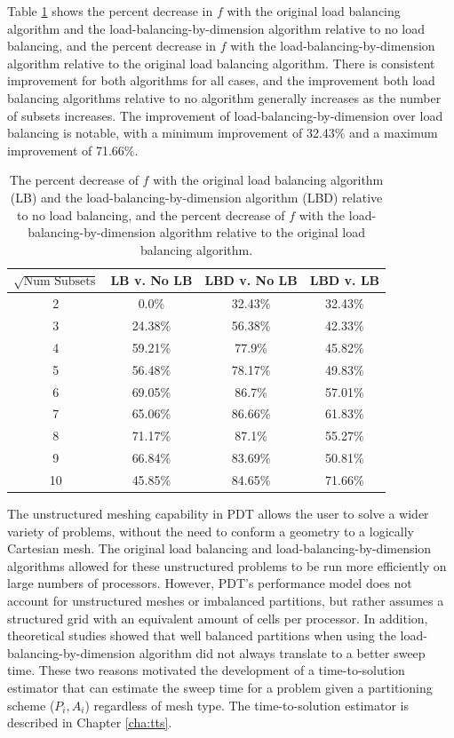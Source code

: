 Table \ref{metric_improvement} shows the percent decrease in $f$ with the original load balancing algorithm and the load-balancing-by-dimension algorithm relative to no load balancing, and the percent decrease in $f$ with the load-balancing-by-dimension algorithm relative to the original load balancing algorithm.
There is consistent improvement for both algorithms for all cases, and the improvement both load balancing algorithms relative to no algorithm generally increases as the number of subsets increases. The improvement of load-balancing-by-dimension over load balancing is notable, with a minimum improvement of 32.43\% and a maximum improvement of 71.66\%.
\begin{table}[H]
\centering
\caption{The percent decrease of $f$ with the original load balancing algorithm (LB) and the load-balancing-by-dimension algorithm (LBD) relative to no load balancing, and the percent decrease of $f$ with the load-balancing-by-dimension algorithm relative to the original load balancing algorithm.}
\label{metric_improvement}
\begin{tabular}{c|c|c|c}
\centering
\textbf{$\sqrt{\text{Num Subsets}}$} & \textbf{LB v. No LB}  & \textbf{LBD v. No LB} & \textbf{LBD v. LB} \\ \hline
2&0.0\%&32.43\%&32.43\%\\ \hline
3&24.38\%&56.38\%&42.33\%\\ \hline
4&59.21\%&77.9\%&45.82\%\\ \hline
5&56.48\%&78.17\%&49.83\%\\ \hline
6&69.05\%&86.7\%&57.01\%\\ \hline
7&65.06\%&86.66\%&61.83\%\\ \hline
8&71.17\%&87.1\%&55.27\%\\ \hline
9&66.84\%&83.69\%&50.81\%\\ \hline
10&45.85\%&84.65\%&71.66\%
\end{tabular}
\end{table}

The unstructured meshing capability in PDT allows the user to solve a wider variety of problems, without the need to conform a geometry to a logically Cartesian mesh.
The original load balancing and load-balancing-by-dimension algorithms allowed for these unstructured problems to be run more efficiently on large numbers of processors.
However, PDT's performance model does not account for unstructured meshes or imbalanced partitions, but rather assumes a structured grid with an equivalent amount of cells per processor.
In addition, theoretical studies showed that well balanced partitions when using the load-balancing-by-dimension algorithm did not always translate to a better sweep time.
These two reasons motivated the development of a time-to-solution estimator that can estimate the sweep time for a problem given a partitioning scheme ($P_i, A_i$) regardless of mesh type. The time-to-solution estimator is described in Chapter \ref{cha:tts}.


